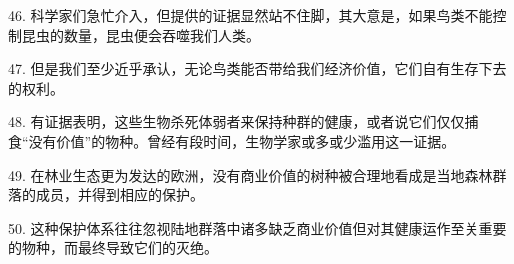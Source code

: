 46. 科学家们急忙介入，但提供的证据显然站不住脚，其大意是，如果鸟类不能控制昆虫的数量，昆虫便会吞噬我们人类。

47. 但是我们至少近乎承认，无论鸟类能否带给我们经济价值，它们自有生存下去的权利。

48. 有证据表明，这些生物杀死体弱者来保持种群的健康，或者说它们仅仅捕食“没有价值”的物种。曾经有段时间，生物学家或多或少滥用这一证据。

49. 在林业生态更为发达的欧洲，没有商业价值的树种被合理地看成是当地森林群落的成员，并得到相应的保护。

50. 这种保护体系往往忽视陆地群落中诸多缺乏商业价值但对其健康运作至关重要的物种，而最终导致它们的灭绝。